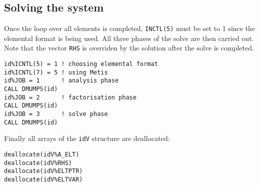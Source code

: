 \subsection{Solving the system}

Once the loop over all elements is completed, {\tt INCTL(5)}
must be set to 1 since the elemental format is being used. 
All three phases of the solve are then carried out. Note that the 
vector {\tt RHS} is overriden by the solution after the solve is completed.   

\begin{verbatim}
id%ICNTL(5) = 1 ! choosing elemental format
id%ICNTL(7) = 5 ! using Metis
id%JOB = 1      ! analysis phase 
CALL DMUMPS(id)
id%JOB = 2      ! factorisation phase 
CALL DMUMPS(id)
id%JOB = 3      ! solve phase
CALL DMUMPS(id)
\end{verbatim}

Finally all arrays of the {\tt idV} structure are deallocated:
\begin{verbatim}
deallocate(idV%A_ELT)
deallocate(idV%RHS)
deallocate(idV%ELTPTR)
deallocate(idV%ELTVAR)
\end{verbatim}


